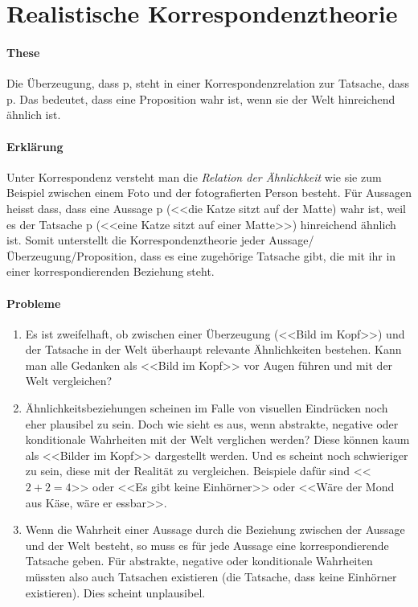 \documentclass[../main.tex]{subfiles}
\begin{document}
\section{Realistische Korrespondenztheorie}
\paragraph{These} Die Überzeugung, dass p, steht in einer Korrespondenzrelation zur Tatsache, dass p. Das bedeutet, dass eine Proposition wahr ist, wenn sie der Welt hinreichend ähnlich ist. 
\paragraph{Erklärung} Unter Korrespondenz versteht man die \textit{Relation der Ähnlichkeit} wie sie zum Beispiel zwischen einem Foto und der fotografierten Person besteht. Für Aussagen heisst dass, dass eine Aussage p (<<die Katze sitzt auf der Matte) wahr ist, weil es der Tatsache p (<<eine Katze sitzt auf einer Matte>>) hinreichend ähnlich ist. Somit unterstellt die Korrespondenztheorie jeder Aussage/Überzeugung/Proposition, dass es eine zugehörige Tatsache gibt, die mit ihr in einer korrespondierenden Beziehung steht. 
\paragraph{Probleme}
\begin{enumerate}
	\item Es ist zweifelhaft, ob zwischen einer Überzeugung (<<Bild im Kopf>>) und der Tatsache in der Welt überhaupt relevante Ähnlichkeiten bestehen. Kann man alle Gedanken als <<Bild im Kopf>> vor Augen führen und mit der Welt vergleichen?
	\item Ähnlichkeitsbeziehungen scheinen im Falle von visuellen Eindrücken noch eher plausibel zu sein. Doch wie sieht es aus, wenn abstrakte, negative oder konditionale Wahrheiten mit der Welt verglichen werden? Diese können kaum als <<Bilder im Kopf>> dargestellt werden. Und es scheint noch schwieriger zu sein, diese mit der Realität zu vergleichen. Beispiele dafür sind <<$2+2=4$>> oder <<Es gibt keine Einhörner>> oder <<Wäre der Mond aus Käse, wäre er essbar>>. 
	\item Wenn die Wahrheit einer Aussage durch die Beziehung zwischen der Aussage und der Welt besteht, so muss es für jede Aussage eine korrespondierende Tatsache geben. Für abstrakte, negative oder konditionale Wahrheiten müssten also auch Tatsachen existieren (die Tatsache, dass keine Einhörner existieren). Dies scheint unplausibel. 
\end{enumerate}
\end{document}
